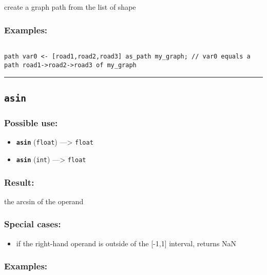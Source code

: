 \documentclass[]{book}
\providecommand{\tightlist}{%
  \setlength{\itemsep}{0pt}\setlength{\parskip}{0pt}}
\theoremstyle{definition}
\theoremstyle{definition}
\theoremstyle{definition}
\theoremstyle{remark}
\begin{document}
create a graph path from the list of shape

\subsubsection{Examples:}\label{examples-44}

\begin{verbatim}
 
path var0 <- [road1,road2,road3] as_path my_graph; // var0 equals a path road1->road2->road3 of my_graph
\end{verbatim}

\begin{center}\rule{0.5\linewidth}{\linethickness}\end{center}

\subsection{\texorpdfstring{\texttt{asin}}{asin}}\label{asin}

\subsubsection{Possible use:}\label{possible-use-55}

\begin{itemize}
\tightlist
\item
  \textbf{\texttt{asin}} (\texttt{float}) ---\textgreater{}
  \texttt{float}
\item
  \textbf{\texttt{asin}} (\texttt{int}) ---\textgreater{} \texttt{float}
\end{itemize}

\subsubsection{Result:}\label{result-54}

the arcsin of the operand

\subsubsection{Special cases:}\label{special-cases-22}

\begin{itemize}
\tightlist
\item
  if the right-hand operand is outside of the {[}-1,1{]} interval,
  returns NaN
\end{itemize}

\subsubsection{Examples:}\label{examples-45}
\end{document}
